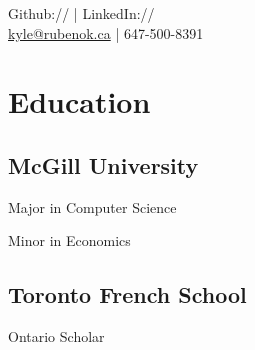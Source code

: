 \documentclass[]{deedy-resume-openfont}
\begin{document}
%
%
\lastupdated

%
%
{
Github:// \href{https://github.com/krubenok}{} | LinkedIn://  \href{https://www.linkedin.com/in/krubenok}{} \\
\href{mailto:kyle@rubenok.ca}{kyle@rubenok.ca} | 647-500-8391}

%
%

\begin{minipage}[t]{0.33\textwidth} 


\section{Education} 

\subsection{McGill University}
\vspace{\topsep}
\begin{tightemize}
\item Major in Computer Science
\item Minor in Economics
\end{tightemize}
\sectionsep


\subsection{Toronto French School}
Ontario Scholar\\
\sectionsep




\end{minipage}
\end{document}
